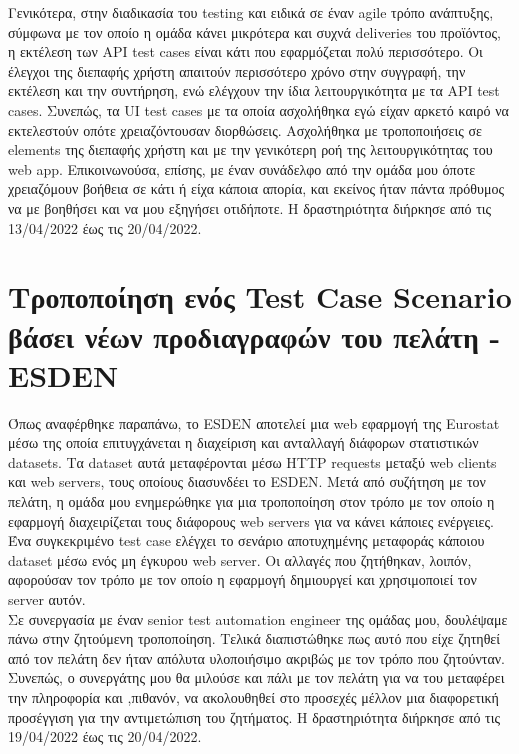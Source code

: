 Γενικότερα, στην διαδικασία του testing και ειδικά 
σε έναν agile τρόπο ανάπτυξης, σύμφωνα με τον οποίο η ομάδα κάνει μικρότερα και συχνά deliveries του προϊόντος, η εκτέλεση των API test cases είναι κάτι που 
εφαρμόζεται πολύ περισσότερο. Οι έλεγχοι της διεπαφής χρήστη απαιτούν περισσότερο χρόνο στην συγγραφή, την εκτέλεση και την συντήρηση, ενώ ελέγχουν την ίδια 
λειτουργικότητα με τα API test cases. Συνεπώς, τα UI test cases με τα οποία ασχολήθηκα εγώ είχαν αρκετό καιρό να εκτελεστούν οπότε χρειαζόντουσαν διορθώσεις.
Ασχολήθηκα με τροποποιήσεις σε elements της διεπαφής χρήστη και με την γενικότερη ροή της λειτουργικότητας του web app. Επικοινωνούσα, επίσης, με έναν συνάδελφο 
από την ομάδα μου όποτε χρειαζόμουν βοήθεια σε κάτι ή είχα κάποια απορία, και εκείνος ήταν πάντα πρόθυμος να με βοηθήσει και να μου εξηγήσει οτιδήποτε.
Η δραστηριότητα διήρκησε από τις 13/04/2022 έως τις 20/04/2022.

\section {Τροποποίηση ενός Test Case Scenario βάσει νέων προδιαγραφών του πελάτη - ESDEN}
Όπως αναφέρθηκε παραπάνω, το ESDEN αποτελεί μια web εφαρμογή της Eurostat μέσω της οποία επιτυγχάνεται η διαχείριση και ανταλλαγή διάφορων στατιστικών datasets. Τα dataset 
αυτά μεταφέρονται μέσω HTTP requests μεταξύ web clients και web servers, τους οποίους διασυνδέει το ESDEN. Μετά από συζήτηση με τον πελάτη, η ομάδα μου ενημερώθηκε για μια 
τροποποίηση στον τρόπο με τον οποίο η εφαρμογή διαχειρίζεται τους διάφορους web servers για να κάνει κάποιες ενέργειες. Ένα συγκεκριμένο test case ελέγχει το σενάριο αποτυχημένης 
μεταφοράς κάποιου dataset μέσω ενός μη έγκυρου web server. Οι αλλαγές που ζητήθηκαν, λοιπόν, αφορούσαν τον τρόπο με τον οποίο η εφαρμογή δημιουργεί και χρησιμοποιεί 
τον server αυτόν. \\ 

Σε συνεργασία με έναν senior test automation engineer της ομάδας μου, δουλέψαμε πάνω στην ζητούμενη τροποποίηση. Τελικά διαπιστώθηκε πως αυτό που είχε ζητηθεί 
από τον πελάτη δεν ήταν απόλυτα υλοποιήσιμο ακριβώς με τον τρόπο που ζητούνταν. Συνεπώς, ο συνεργάτης μου θα μιλούσε και πάλι με τον πελάτη για να του μεταφέρει 
την πληροφορία και ,πιθανόν, να ακολουθηθεί στο προσεχές μέλλον μια διαφορετική προσέγγιση για την αντιμετώπιση του ζητήματος. Η δραστηριότητα διήρκησε από τις 19/04/2022 έως τις 20/04/2022.


